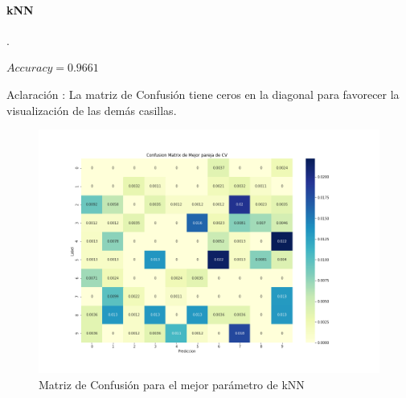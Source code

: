 \paragraph{kNN}.
\par 
\vspace{0.5cm}
$Accuracy = 0.9661 $
\par
\vspace{0.5cm}
Aclaración : La matriz de Confusión tiene ceros en la diagonal para favorecer la visualización de las demás casillas.
\begin{figure}[H]
    \centering
    \includegraphics[width=14cm]{images/ConfMatrix_knn.png}%
    \qquad
    \caption{Matriz de Confusión para el mejor parámetro de kNN }
    \label{knn_MatrizConf}%
\end{figure}



